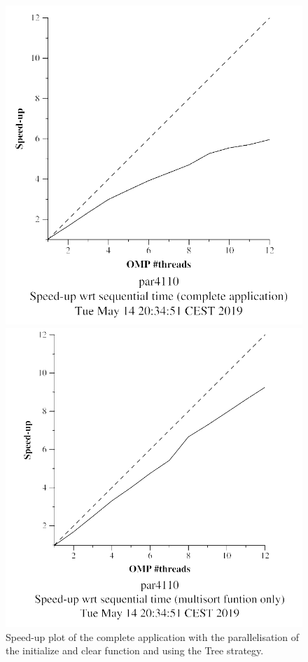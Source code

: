\documentclass[12pt, a4paper]{article}
\begin{document}
\begin{figure}[H]
\centering
\begin{minipage}[b]{0.4\linewidth}
  \centering
  \includegraphics[scale=0.5]{./images/S2/multisort-omp-strong_boada-4_tree_op2_complete_application}
  \caption{Speed-up plot of the complete application with the parallelisation of the initialize and clear function and using the Tree strategy.}
  \label{fig:mandel-omp-10000-strong-21-time}
\end{minipage}%
\hspace{0.5cm}
\begin{minipage}[b]{0.4\linewidth}
  \centering
  \includegraphics[scale=0.5]{./images/S2/multisort-omp-strong_boada-4_tree_op2_multisort_only}

\end{minipage}
\end{figure}
\end{document}
